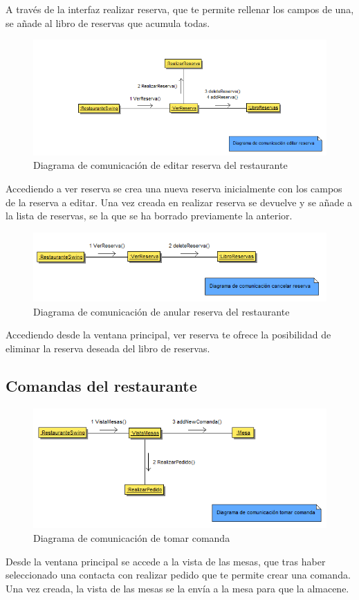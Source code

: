 \documentclass[spanish,a4paper,11pt, twoside]{report}	%
\begin{document}
		A través de la interfaz realizar reserva, que te permite rellenar los campos de 
		una, se añade al libro de reservas que acumula todas.


		\begin{figure}[!h]
		\centering
		\includegraphics[scale=0.6]{DCeditarreserva.png}
 		\caption{Diagrama de comunicación de editar reserva del restaurante}
		\end{figure}
		Accediendo a ver reserva se crea una nueva reserva inicialmente
		con los campos de la reserva a editar. Una vez creada en realizar reserva se devuelve
		y se añade a la lista de reservas, se la que se ha borrado previamente la anterior.

		\begin{figure}[!h]
		\centering
		\includegraphics[scale=0.65]{DCeliminarreserva.png}
 		\caption{Diagrama de comunicación de anular reserva del restaurante}
		\end{figure}
		Accediendo desde la ventana principal, ver reserva te ofrece la posibilidad de eliminar la reserva deseada del libro de reservas.


		\subsection{Comandas del restaurante}

		\begin{figure}[!h]
		\centering
		\includegraphics[scale=0.65]{DCcomanda.png}
		\caption{Diagrama de comunicación de tomar comanda}
		\end{figure}
		Desde la ventana principal se accede a la vista de las mesas, que tras haber seleccionado una contacta con realizar
		pedido que te permite crear una comanda. Una vez creada, la vista de las mesas se la envía a la mesa para que la almacene.
\end{document}
